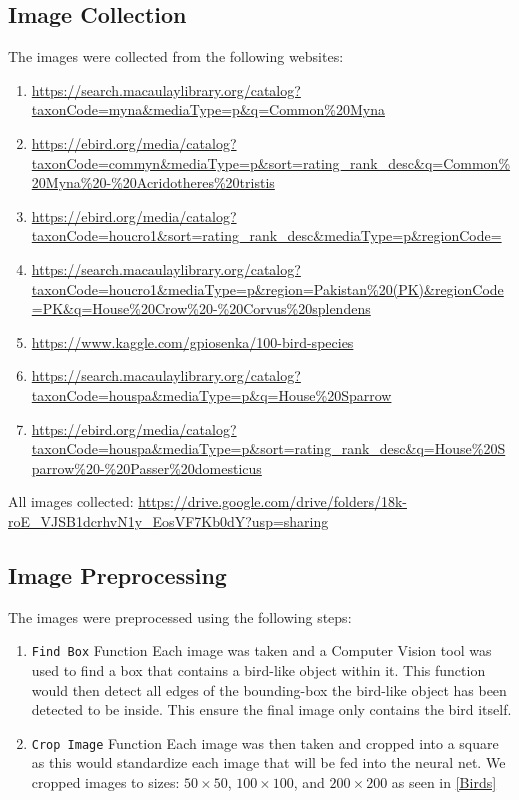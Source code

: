 \documentclass[11pt]{article}
\begin{document}
    \subsection*{Image Collection}
    The images were collected from the following websites:
    \begin{enumerate}
        \item \url{https://search.macaulaylibrary.org/catalog?taxonCode=myna&mediaType=p&q=Common%20Myna}
        \item \url{https://ebird.org/media/catalog?taxonCode=commyn&mediaType=p&sort=rating_rank_desc&q=Common%20Myna%20-%20Acridotheres%20tristis}
        \item \url{https://ebird.org/media/catalog?taxonCode=houcro1&sort=rating_rank_desc&mediaType=p&regionCode=}
        \item \url{https://search.macaulaylibrary.org/catalog?taxonCode=houcro1&mediaType=p&region=Pakistan%20(PK)&regionCode=PK&q=House%20Crow%20-%20Corvus%20splendens}
        \item \url{https://www.kaggle.com/gpiosenka/100-bird-species}
        \item \url{https://search.macaulaylibrary.org/catalog?taxonCode=houspa&mediaType=p&q=House%20Sparrow}
        \item \url{https://ebird.org/media/catalog?taxonCode=houspa&mediaType=p&sort=rating_rank_desc&q=House%20Sparrow%20-%20Passer%20domesticus}
    \end{enumerate}     
    All images collected: \url{https://drive.google.com/drive/folders/18k-roE_VJSB1dcrhvN1y_EosVF7Kb0dY?usp=sharing}
    \subsection*{Image Preprocessing}
    The images were preprocessed using the following steps:
    \begin{enumerate}
        \item \texttt{Find Box} Function \newline 
        Each image was taken and a Computer Vision tool was used to find a box that contains a bird-like object within it. This function would then detect all edges of the bounding-box the bird-like object has been detected to be inside. This ensure the final image only contains the bird itself.
        \item \texttt{Crop Image} Function  \newline
        Each image was then taken and cropped into a square as this would standardize each image that will be fed into the neural net. We cropped images to sizes: $50\times 50$, $100\times 100$, and $200\times 200$ as seen in \ref{Birds}
    \end{enumerate}
\end{document}
